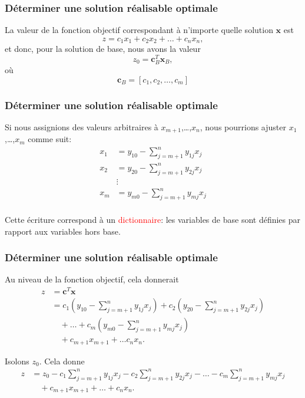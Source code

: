 \documentclass[t,usepdftitle=false]{beamer}
\def\bc{\boldsymbol{c}}
\def\bx{\boldsymbol{x}}
\begin{document}
\begin{frame}
\frametitle{Déterminer une solution réalisable optimale}

La valeur de la fonction objectif correspondant à n'importe quelle solution $\bx$ est
\[
z = c_1x_1 + c_2x_2 + \ldots + c_nx_n,
\]
et donc, pour la solution de base, nous avons la valeur
\[
z_0 = \bc_B^T\bx_B,
\]
où
\[
\bc_B = [ c_1, c_2,\ldots, c_m]
\]
\end{frame}

\begin{frame}
\frametitle{Déterminer une solution réalisable optimale}

Si nous assignions des valeurs arbitraires à $x_{m+1}$,\ldots,$x_n$, nous pourrions ajuster $x_1$,\ldots,$x_m$ comme suit:
\begin{align*}
x_1 &= y_{10} - \sum_{j=m+1}^n y_{1j}x_j \\
x_2 &= y_{20} - \sum_{j=m+1}^n y_{2j}x_j \\
& \vdots \\
x_m &= y_{m0} - \sum_{j=m+1}^n y_{mj}x_j \\
\end{align*}

Cette écriture correspond à un \textcolor{red}{dictionnaire}: les variables de base sont définies par rapport aux variables hors base.

\end{frame}


\begin{frame}
\frametitle{Déterminer une solution réalisable optimale}

Au niveau de la fonction objectif, cela donnerait
\begin{align*}
z &= \bc^T\bx \\
&= c_1\left( y_{10} - \sum_{j=m+1}^n y_{1j}x_j \right) + c_2\left( y_{20} - \sum_{j=m+1}^n y_{2j}x_j \right) \\
& \quad + \ldots + c_m\left( y_{m0} - \sum_{j=m+1}^n y_{mj}x_j \right) \\
& \quad + c_{m+1} x_{m+1} + \ldots c_nx_n.
\end{align*}

\mbox

Isolons $z_0$. Cela donne
\begin{align*}
z &= z_0 - c_1\sum_{j=m+1}^n y_{1j}x_j
- c_2\sum_{j=m+1}^n y_{2j}x_j - \ldots -
c_m\sum_{j=m+1}^n y_{mj}x_j \\
& \quad + c_{m+1} x_{m+1} + \ldots + c_nx_n.
\end{align*}
\end{frame}
\end{document}
